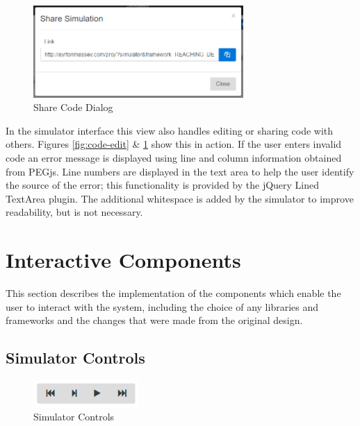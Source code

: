 \documentclass[bsc,twoside,singlespacing,parskip,logo,notimes,normalheadings]{infthesis}
\begin{document}
        \begin{figure}[!ht]
          \centering
          \includegraphics[width=8cm]{img/code-share.png}
          \caption{Share Code Dialog}\label{fig:code-share}
        \end{figure}

        In the simulator interface this view also handles editing or
        sharing code with others. Figures \ref{fig:code-edit} \&
        \ref{fig:code-share} show this in action. If the user enters
        invalid code an error message is displayed using line and
        column information obtained from PEGjs. Line numbers are
        displayed in the text area to help the user identify the
        source of the error; this functionality is provided by the
        jQuery Lined TextArea\cite{jquerylinedtextarea} plugin. The
        additional whitespace is added by the simulator to improve
        readability, but is not necessary.
        

    \section{Interactive Components}
    This section describes the implementation of the components which
    enable the user to interact with the system, including the choice
    of any libraries and frameworks and the changes that were made
    from the original design.
    
        \subsection{Simulator Controls}

        \begin{figure}
          \centering
          \includegraphics[width=4cm, trim=0 0 0 30]{img/simcontrols.png}
          \captionsetup{width=4cm, justification=centering}
          \caption{Simulator Controls}\label{fig:simcontrols}
        \end{figure}
\end{document}
